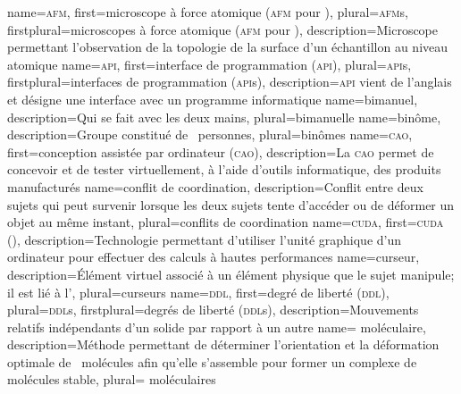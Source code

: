 %
{%
	name={\textsc{afm}},
	first={microscope à force atomique (\textsc{afm} pour )},%
	plural={\textsc{afm}s},%
	firstplural={microscopes à force atomique (\textsc{afm} pour )},%
	description={Microscope permettant l'observation de la topologie de la surface d'un échantillon au niveau atomique}
}
%
{%
	name={\textsc{api}},%
	first={interface de programmation (\textsc{api})},%
	plural={\textsc{api}s},%
	firstplural={interfaces de programmation (\textsc{api}s)},%
	description={\textsc{api} vient de l'anglais  et désigne une interface avec un programme informatique}%
}
%
{%
	name={bimanuel},%
	description={Qui se fait avec les deux mains},%
	plural={bimanuelle}%
}
%
{%
	name={binôme},%
	description={Groupe constitué de ~personnes},%
	plural={binômes}%
}
%
{%
	name={\textsc{cao}},%
	first={conception assistée par ordinateur (\textsc{cao})},%
	description={La \textsc{cao} permet de concevoir et de tester virtuellement, à l'aide d'outils informatique, des produits manufacturés}%
}
%
{%
	name={conflit de coordination},%
	description={Conflit entre deux sujets qui peut survenir lorsque les deux sujets tente d'accéder ou de déformer un objet au même instant},%
	plural={conflits de coordination}%
}
%
{%
	name={\textsc{cuda}},%
	first={\textsc{cuda} ()},%
	description={Technologie permettant d'utiliser l'unité graphique d'un ordinateur pour effectuer des calculs à hautes performances}%
}
%
{%
	name={curseur},%
	description={Élément virtuel associé à un élément physique que le sujet manipule; il est lié à l'},%
	plural={curseurs}%
}
%
{%
	name={\textsc{ddl}},%
	first={degré de liberté (\textsc{ddl})},%
	plural={\textsc{ddl}s},%
	firstplural={degrés de liberté (\textsc{ddl}s)},%
	description={Mouvements relatifs indépendants d'un solide par rapport à un autre}%
}
%
{%
	name={ moléculaire},%
	description={Méthode permettant de déterminer l'orientation et la déformation optimale de ~molécules afin qu'elle s'assemble pour former un complexe de molécules stable},%
	plural={ moléculaires}%
}
%
